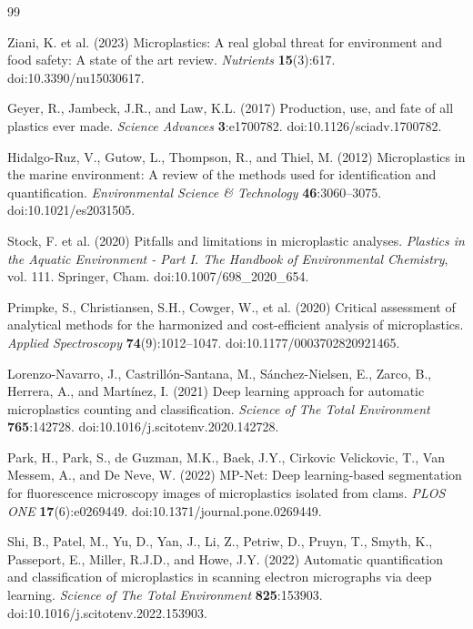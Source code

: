 \documentclass[11pt]{article}
\begin{document}
\begin{thebibliography}{99}

Ziani, K. et al. (2023) Microplastics: A real global threat for environment and food safety: A state of the art review. \textit{Nutrients} \textbf{15}(3):617. doi:10.3390/nu15030617.

Geyer, R., Jambeck, J.R., and Law, K.L. (2017) Production, use, and fate of all plastics ever made. \textit{Science Advances} \textbf{3}:e1700782. doi:10.1126/sciadv.1700782.

Hidalgo-Ruz, V., Gutow, L., Thompson, R., and Thiel, M. (2012) Microplastics in the marine environment: A review of the methods used for identification and quantification. \textit{Environmental Science \& Technology} \textbf{46}:3060--3075. doi:10.1021/es2031505.

Stock, F. et al. (2020) Pitfalls and limitations in microplastic analyses. \textit{Plastics in the Aquatic Environment - Part I. The Handbook of Environmental Chemistry}, vol. 111. Springer, Cham. doi:10.1007/698\_2020\_654.

Primpke, S., Christiansen, S.H., Cowger, W., et al. (2020) Critical assessment of analytical methods for the harmonized and cost-efficient analysis of microplastics. \textit{Applied Spectroscopy} \textbf{74}(9):1012--1047. doi:10.1177/0003702820921465.

Lorenzo-Navarro, J., Castrill\'on-Santana, M., S\'anchez-Nielsen, E., Zarco, B., Herrera, A., and Mart\'inez, I. (2021) Deep learning approach for automatic microplastics counting and classification. \textit{Science of The Total Environment} \textbf{765}:142728. doi:10.1016/j.scitotenv.2020.142728.

Park, H., Park, S., de Guzman, M.K., Baek, J.Y., Cirkovic Velickovic, T., Van Messem, A., and De Neve, W. (2022) MP-Net: Deep learning-based segmentation for fluorescence microscopy images of microplastics isolated from clams. \textit{PLOS ONE} \textbf{17}(6):e0269449. doi:10.1371/journal.pone.0269449.

Shi, B., Patel, M., Yu, D., Yan, J., Li, Z., Petriw, D., Pruyn, T., Smyth, K., Passeport, E., Miller, R.J.D., and Howe, J.Y. (2022) Automatic quantification and classification of microplastics in scanning electron micrographs via deep learning. \textit{Science of The Total Environment} \textbf{825}:153903. doi:10.1016/j.scitotenv.2022.153903.


\end{thebibliography}
\end{document}
